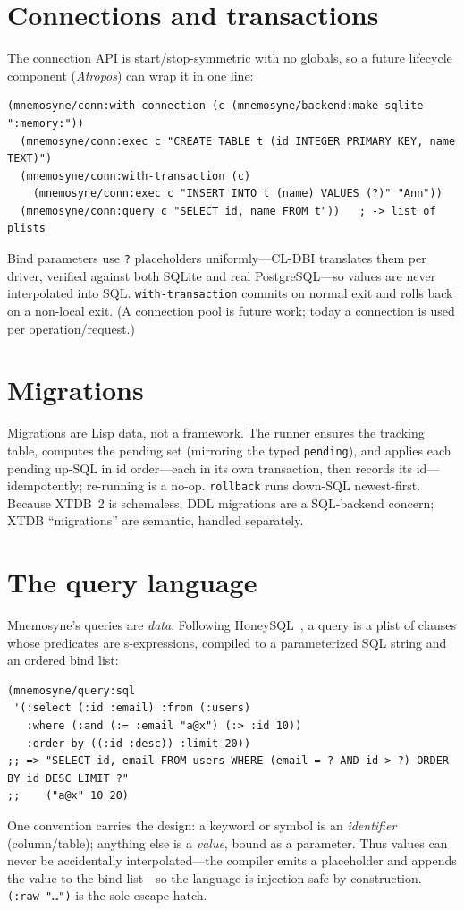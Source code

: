 \documentclass[11pt,a4paper]{article}
\begin{document}
\section{Connections and transactions}
\label{sec:conn}
The connection API is start/stop-symmetric with no globals, so a future lifecycle component
(\emph{Atropos}) can wrap it in one line:
\begin{lstlisting}
(mnemosyne/conn:with-connection (c (mnemosyne/backend:make-sqlite ":memory:"))
  (mnemosyne/conn:exec c "CREATE TABLE t (id INTEGER PRIMARY KEY, name TEXT)")
  (mnemosyne/conn:with-transaction (c)
    (mnemosyne/conn:exec c "INSERT INTO t (name) VALUES (?)" "Ann"))
  (mnemosyne/conn:query c "SELECT id, name FROM t"))   ; -> list of plists
\end{lstlisting}
Bind parameters use \texttt{?} placeholders uniformly---CL-DBI translates them per driver,
verified against both SQLite and real PostgreSQL---so values are never interpolated into
SQL. \texttt{with-transaction} commits on normal exit and rolls back on a non-local exit.
(A connection pool is future work; today a connection is used per operation/request.)

\section{Migrations}
\label{sec:migrate}
Migrations are Lisp data, not a framework. The runner ensures the tracking table, computes
the pending set (mirroring the typed \texttt{pending}), and applies each pending up-SQL in
id order---each in its own transaction, then records its id---idempotently; re-running is a
no-op. \texttt{rollback} runs down-SQL newest-first. Because XTDB~2 is schemaless, DDL
migrations are a SQL-backend concern; XTDB ``migrations'' are semantic, handled separately.

\section{The query language}
\label{sec:query}
Mnemosyne's queries are \emph{data}. Following HoneySQL~\citep{honeysql}, a query is a plist
of clauses whose predicates are s-expressions, compiled to a parameterized SQL string and
an ordered bind list:
\begin{lstlisting}
(mnemosyne/query:sql
 '(:select (:id :email) :from (:users)
   :where (:and (:= :email "a@x") (:> :id 10))
   :order-by ((:id :desc)) :limit 20))
;; => "SELECT id, email FROM users WHERE (email = ? AND id > ?) ORDER BY id DESC LIMIT ?"
;;    ("a@x" 10 20)
\end{lstlisting}
One convention carries the design: a keyword or symbol is an \emph{identifier}
(column/table); anything else is a \emph{value}, bound as a parameter. Thus values can never
be accidentally interpolated---the compiler emits a placeholder and appends the value to the
bind list---so the language is injection-safe by construction. \texttt{(:raw "\ldots")} is
the sole escape hatch.
\end{document}
